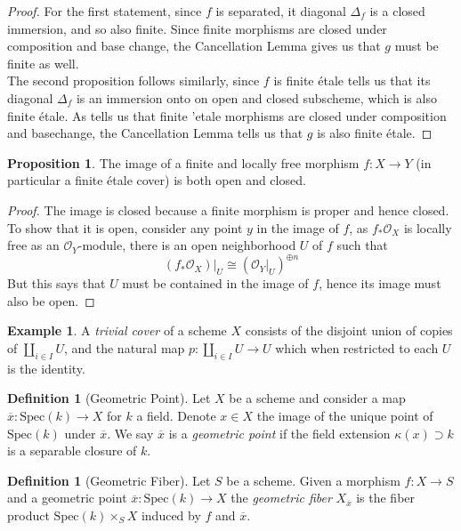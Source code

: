 \documentclass{article}
\theoremstyle{definition}
\newtheorem{proposition}[theorem]{Proposition}
\newtheorem{definition}[theorem]{Definition}
\newtheorem{example}[theorem]{Example}
\theoremstyle{remark}
\newcommand{\mc}[1]{\mathcal{#1}}
\begin{document}
\begin{proof}	
	For the first statement, since $f$ is separated, it diagonal $\Delta_f$ is a closed immersion, and so also finite. 
	Since finite morphisms are closed under composition and base change, the Cancellation Lemma  gives us that $g$ must be finite as well.\\
\indent The second proposition follows similarly, since $f$ is finite \'etale  tells us that its diagonal $\Delta_f$ is an immersion onto on open and closed subscheme, which is also finite \'etale.
As  tells us that finite 'etale morphisms are closed under composition and basechange, the Cancellation Lemma tells us that $g$ is also finite \'etale.
\end{proof}

\begin{proposition}
	The image of a finite and locally free morphism $f: X \to Y$ (in particular a finite \'etale cover) is both open and closed.
\end{proposition}

\begin{proof}
	The image is closed because a finite morphism is proper and hence closed.
	To show that it is open, consider any point $y$ in the image of $f$, as $f_* \mc{O}_X$ is locally free as an $\mc{O}_Y$-module, there is an open neighborhood $U$ of $f$ such that 
	\[(f_* \mc{O}_X)|_U \cong (\mc{O}_Y|_U)^{\oplus n}\]
	But this says that $U$ must be contained in the image of $f$, hence its image must also be open.
\end{proof}

\begin{example}
	A \textit{trivial cover} of a scheme $X$ consists of the disjoint union of copies of $\coprod_{i \in I} U$, and the natural map $p: \coprod_{i \in I} U \to U$ which when restricted to each $U$ is the identity.
\end{example}

\begin{definition}[Geometric Point]
	Let $X$ be a scheme and consider a map $\overline{x}: \text{Spec}(k) \to X$ for $k$ a field.
	Denote $x \in X$ the image of the unique point of $\text{Spec}(k)$ under $\overline{x}$.
	We say $\overline{x}$ is a \textit{geometric point} if the field extension $\kappa(x) \supset k$ is a separable closure of $k$.
\end{definition}

\begin{definition}[Geometric Fiber]
	Let $S$ be a scheme. 
	Given a morphism $f: X \to S$ and a geometric point $\overline{x}: \text{Spec}(k) \to X$ the \textit{geometric fiber} $X_{\overline{x}}$ is the fiber product $\text{Spec}(k) \times_S X$ induced by $f$ and $\overline{x}$.
\end{definition}
\end{document}
